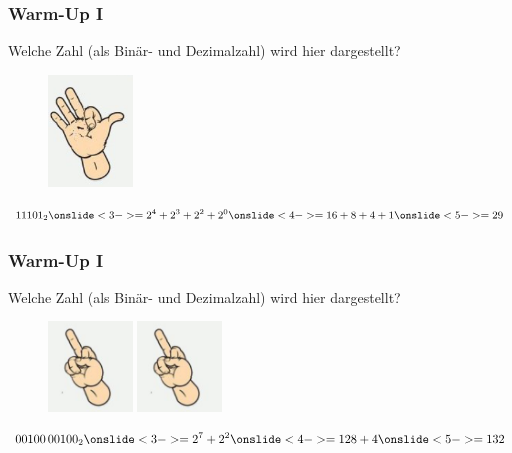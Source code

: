 \documentclass{beamer}
\begin{document}
\begin{frame}
    \frametitle{Warm-Up I}
    Welche Zahl (als Binär- und Dezimalzahl) wird hier dargestellt?
    \begin{figure}[H]
        \centering
        \includegraphics[width=0.2\textwidth]{hand_29}
    \end{figure}
     $$11101_2
    \onslide<3->= 2^4+2^3+2^2+2^0
    \onslide<4->= 16+8+4+1
    \onslide<5->= 29$$
\end{frame}

\begin{frame}
    \frametitle{Warm-Up I}
    Welche Zahl (als Binär- und Dezimalzahl) wird hier dargestellt?
    \begin{figure}[H]
        \centering
        \includegraphics[width=0.2\textwidth]{hand_4}
        \hspace{-0.8cm}
        \includegraphics[width=0.2\textwidth]{hand_4}
    \end{figure}
     $$00100\,00100_2
    \onslide<3->= 2^7+2^2
    \onslide<4->= 128 + 4
    \onslide<5->= 132$$
\end{frame}
\end{document}
